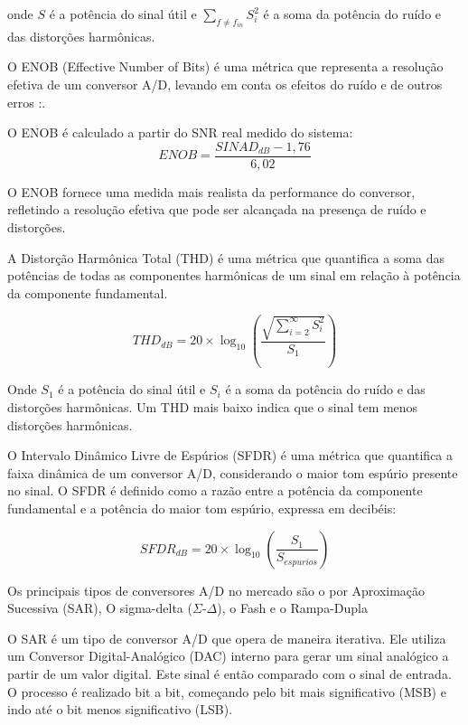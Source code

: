 onde \( S \) é a potência do sinal útil e $\sum_{f \ne f_{in}} S_i^2$ é a soma da potência do ruído e das distorções harmônicas.

O ENOB (Effective Number of Bits) é uma métrica que representa a resolução efetiva de um conversor A/D, levando em conta os efeitos do ruído e de outros erros \cite{ieee_adc}:.

O ENOB é calculado a partir do SNR real medido do sistema:
\begin{equation} \label{eq:ENOB}
ENOB = \frac{SINAD_{dB} - 1,76}{6,02}
\end{equation}

O ENOB fornece uma medida mais realista da performance do conversor, refletindo a resolução efetiva que pode ser alcançada na presença de ruído e distorções.

A Distorção Harmônica Total (THD) é uma métrica que quantifica a soma das potências de todas as componentes harmônicas de um sinal em relação à potência da componente fundamental.

\begin{equation} \label{eq:THD}
THD_{dB} = 20 \times \log_{10} \left( \frac{\sqrt{\sum_{i=2}^{\infty} S_i^2}}{S_1} \right)
\end{equation}

Onde \( S_{1} \) é a potência do sinal útil e \( S_{i} \) é a soma da potência do ruído e das distorções harmônicas. Um THD mais baixo indica que o sinal tem menos distorções harmônicas.

O Intervalo Dinâmico Livre de Espúrios (SFDR) é uma métrica que quantifica a faixa dinâmica de um conversor A/D, considerando o maior tom espúrio presente no sinal. O SFDR é definido como a razão entre a potência da componente fundamental e a potência do maior tom espúrio, expressa em decibéis:

\begin{equation} \label{eq:SFDR}
SFDR_{dB} = 20 \times \log_{10} \left( \frac{S_1}{S_{espurios}} \right)
\end{equation}

Os principais tipos de conversores A/D no mercado são o por Aproximação Sucessiva (SAR), O sigma-delta ($\Sigma$-$\Delta$), o Fash e o Rampa-Dupla

O SAR é um tipo de conversor A/D que opera de maneira iterativa. Ele utiliza um Conversor Digital-Analógico (DAC) interno para gerar um sinal analógico a partir de um valor digital. Este sinal é então comparado com o sinal de entrada. O processo é realizado bit a bit, começando pelo bit mais significativo (MSB) e indo até o bit menos significativo (LSB).

